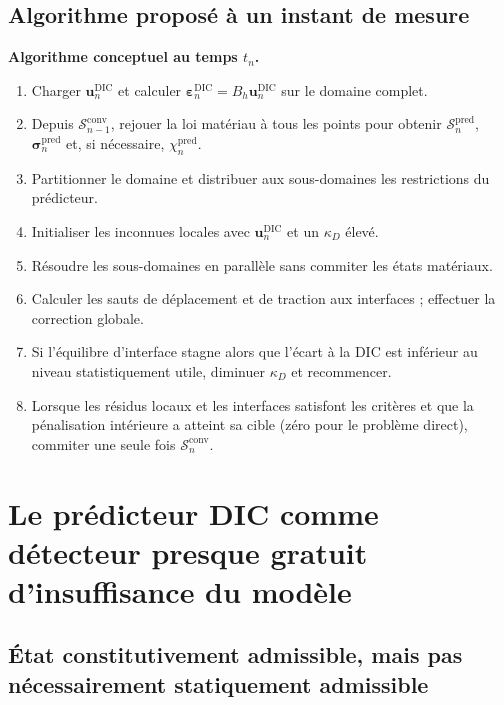 \documentclass[11pt,a4paper]{article}
\newcommand{\udic}{\bm{u}^{\mathrm{DIC}}}
\newcommand{\epsdic}{\bm{\varepsilon}^{\mathrm{DIC}}}
\newcommand{\state}{\mathcal{S}}
\begin{document}
\subsection{Algorithme proposé à un instant de mesure}

\begin{methodbox}
\textbf{Algorithme conceptuel au temps $t_n$.}
\begin{enumerate}
  \item Charger $\udic_n$ et calculer $\epsdic_n=B_h\udic_n$ sur le domaine complet.
  \item Depuis $\state_{n-1}^{\mathrm{conv}}$, rejouer la loi matériau à tous les points pour obtenir
  $\state_n^{\mathrm{pred}}$, $\bm{\sigma}_n^{\mathrm{pred}}$ et, si nécessaire, $\chi_n^{\mathrm{pred}}$.
  \item Partitionner le domaine et distribuer aux sous-domaines les restrictions du prédicteur.
  \item Initialiser les inconnues locales avec $\udic_n$ et un $\kappa_D$ élevé.
  \item Résoudre les sous-domaines en parallèle sans commiter les états matériaux.
  \item Calculer les sauts de déplacement et de traction aux interfaces ; effectuer la correction globale.
  \item Si l'équilibre d'interface stagne alors que l'écart à la DIC est inférieur au niveau statistiquement utile,
  diminuer $\kappa_D$ et recommencer.
  \item Lorsque les résidus locaux et les interfaces satisfont les critères et que la pénalisation intérieure a
  atteint sa cible (zéro pour le problème direct), commiter une seule fois $\state_n^{\mathrm{conv}}$.
\end{enumerate}
\end{methodbox}

\section{Le prédicteur DIC comme détecteur presque gratuit d'insuffisance du modèle}

\subsection{État constitutivement admissible, mais pas nécessairement statiquement admissible}
\end{document}
